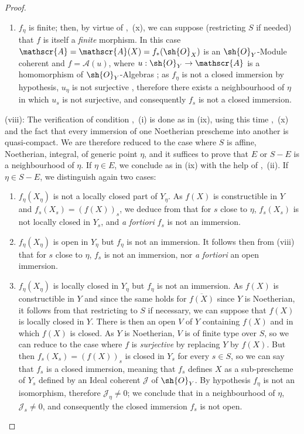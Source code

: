 \begin{proof}
\begin{enumerate}[label=\upshape{$\arabic{enumi}^\circ$}]
  \item $f_\eta$ is finite; then, by virtue of ,~(x), we can suppose (restricting $S$ if needed) that $f$ is itself a \emph{finite} morphism.
  In this case $\mathscr{A}=\mathscr{A}(X)=f_*(\sh{O}_X)$ is an $\sh{O}_Y$-Module coherent  and $f=\mathscr{A}(u)$, where $u:\sh{O}_Y\to\mathscr{A}$ is a homomorphism of $\sh{O}_Y$-Algebras ; as $f_\eta$ is not a closed immersion by hypothesis, $u_\eta$ is not surjective , therefore  there exists a neighbourhood of $\eta$ in which $u_s$ is not surjective, and consequently  $f_s$ is not a closed immersion.
\end{enumerate}

(viii): The verification of condition ,~(i) is done as in (ix), using this time ,~(x) and the fact that every immersion of one Noetherian prescheme into another is quasi-compact.
We are therefore reduced to the case where $S$ is affine, Noetherian, integral, of generic point $\eta$, and it suffices to prove that $E$ or $S-E$ is a neighbourhood of $\eta$.
If $\eta\in E$, we conclude as in (ix) with the help of ,~(ii).
If $\eta\in S-E$, we distinguish again two cases:
\begin{enumerate}[label=\upshape{$\arabic{enumi}^\circ$}]
  \item $f_\eta(X_\eta)$ is not a locally closed part of $Y_\eta$.
  As $f(X)$ is constructible in $Y$  and $f_s(X_s)=(f(X))_s$, we deduce from  that for $s$ close to $\eta$, $f_s(X_s)$ is not locally closed in $Y_s$, and \emph{a fortiori} $f_s$ is not an immersion.

  \item $f_\eta(X_\eta)$ is open in $Y_\eta$ but $f_\eta$ is not an immersion.
  It follows then from (viii) that for $s$ close to $\eta$, $f_s$ is not an immersion, nor \emph{a fortiori} an open immersion.

  \item{} $f_\eta(X_\eta)$ is locally closed in $Y_\eta$ but $f_\eta$ is not an immersion.
  As $f(X)$ is constructible in $Y$  and since the same holds for $\overline{f(X)}$ since $Y$ is Noetherian, it follows from  that restricting to $S$ if necessary, we can suppose that $f(X)$ is locally closed in $Y$.
  There is then an open $V$ of $Y$ containing $f(X)$ and in which $f(X)$ is closed.
  As $Y$ is Noetherian, $V$ is of finite type over $S$, so we can reduce to the case where $f$ is \emph{surjective} by replacing $Y$ by $f(X)$.
  But then $f_s(X_s)=(f(X))_s$ is closed in $Y_s$ for every $s\in S$, so we can say that $f_s$ is a closed immersion, meaning that $f_s$ defines $X$ as a sub-prescheme of $Y_s$ defined by an Ideal coherent $\mathscr{J}$ of $\sh{O}_Y$.
  By hypothesis $f_\eta$ is not an isomorphism, therefore $\mathscr{J}_\eta\neq 0$; we conclude  that in a neighbourhood of $\eta$, $\mathscr{J}_s\neq 0$, and consequently the closed immersion $f_s$ is not open.
\end{enumerate}


\end{proof}
